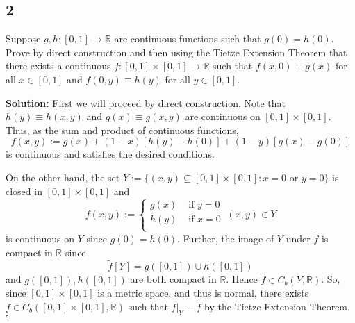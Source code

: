 \documentclass[12pt]{article}
\newcounter{ProofCounter}
\newenvironment{Solution}{\stepcounter{ProofCounter}\textbf{Solution:}}{\hfill$\square$}
\begin{document}
\subsection*{2}
\begin{tcolorbox}
  Suppose $g, h : [0,1] \rightarrow \mathbb{R}$ are continuous functions such that $g(0) = h(0)$. Prove by direct construction and then using the
  Tietze Extension Theorem that there exists a continuous $f : [0,1] \times [0,1] \rightarrow \mathbb{R}$ such that $f(x,0) \equiv g(x)$ for all $x \in
  [0,1]$ and $f(0,y) \equiv h(y)$ for all $y \in [0,1]$.
\end{tcolorbox}
\begin{Solution}
  First we will proceed by direct construction. Note that $h(y) \equiv h(x,y)$ and $g(x) \equiv g(x,y)$ are continuous on $[0,1] \times [0,1]$.
  Thus, as the sum and product of continuous functions, 
  \[
    f(x,y) := g(x) + (1-x)[h(y) - h(0)] + (1-y)[g(x) - g(0)]
  \]
  is continuous and satisfies the desired conditions.

  On the other hand, the set $Y := \{(x,y) \subseteq [0,1]\times [0,1] : x = 0 \text{ or } y = 0\}$ is closed in $[0,1] \times [0,1]$ and 
  \[
    \tilde{f}(x,y) := \left\{ \begin{array}{cl}
        g(x) & \text{ if } y = 0 \\
        h(y) & \text{ if } x = 0 \\
    \end{array} \right. \ (x,y) \in Y
  \]
  is continuous on $Y$ since $g(0) = h(0)$. Further, the image of $Y$ under $\tilde{f}$ is compact in $\mathbb{R}$ since 
  \[
    \tilde{f}[Y] = g([0,1]) \cup h([0,1])
  \]
  and $g([0,1]), h([0,1])$ are both compact in $\mathbb{R}$. Hence $\tilde{f} \in C_b(Y, \mathbb{R})$. So, since $[0,1] \times [0,1]$ is a metric space, and
  thus is normal, there exists $f \in C_b([0,1]\times[0,1], \mathbb{R})$ such that $f\big|_{Y} \equiv \tilde{f}$ by the Tietze Extension
  Theorem.
\end{Solution}
\end{document}
